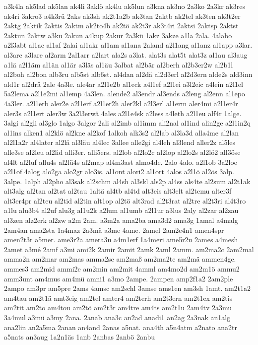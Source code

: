 {a3k4la
ak5lad
ak5lan
ak4li
3aklö
ak4lu
ak5lun
a3kna
ak3no
2a3ko
2a3kr
ak3res
ak4ri
3akro3
a4k3rü
2aks
ak3sh
ak2t1a2b
ak3tan
2aktb
ak2tel
ak3ten
ak3t2er
2aktg
2aktik
2aktis
2aktm
ak2to4b
ak2tö
ak2t3r
ak3t4ri
2aktsi
2aktsp
2aktst
2aktun
2aktw
a3ku
2akun
a4kup
2akur
2a3kü
1akz
3akze
a1la
2ala.
4alabo
a2l3abt
al1ac
al1af
2alai
al1akr
al1am
al1ana
2aland
a2l1ang
al1anz
al1app
a3lar.
al3arc
a3lare
al2arm
2al1arr
a2lart
ala2s
a3lat.
alat3s
alat5t
alat3z
al1au
al3aug
a1lä
a2l1äm
al1än
al1är
a3läs
al1äu
3albat
al2bär
al2berh
al2b3er2w
al2b1l
al2boh
al2bon
alb3ru
alb5st
alb6st.
al4dan
al2dä
al2d3erl
al2d3ern
alde2s
ald3inn
ald1r
al2drä
2ale
4a3le.
ale4ar
a2l1e2b
al1eck
a4l1ef
a2l1ei
a3l2eic
a4lein
a2l1el
5a2lema
a2l1e2mi
al1emp
4a3len.
alende2
al3endr
al3ends
a2leng
al2enn
al1epo
4a3ler.
a2l1erb
aler2e
a2l1erf
a2l1er2h
aler2kl
a2l3erl
al1erm
aler4mi
a2l1er4r
aler3s
a2l1ert
aler3w
3a2l3erwä
4ales
a2l1e4sk
a2less
a4leth
a2l1eu
alf4r
1alge.
3algi
al2gli
al3glo
1algo
3algor
2ali
al2imb
al1imm
ali2nal
al1ind
alin2ge
a2l1in2q
al1ins
alken1
al2klö
al2kne
al2kof
1alkoh
alk3s2
al2lab
al3la3d
alla4me
al2lan
al2l1a2r
al4later
al2lä
al3läu
al4lec
3allee
alle2gi
al4leh
al3lend
aller2z
al5les
alle3se
al2leu
al2lid
alli3er.
alli5ers.
al2lob
al2lo2c
al2lop
al2lo2s
al2lö2
all3öse
al4lt
al2luf
allu4s
al2lü4s
al2map
al4m3ast
almo4de.
2alo
4alo.
a2l1ob
3a2loe
a2l1of
4alog
alo2ga
alo2gr
alo3is.
al1ont
alori2
al1ort
4alos
a2l1ö
al2ös
3alp.
3alpe.
1alph
al2pho
al3sak
al2schm
al4sh
al3skl
als2p
al4ss
als4te
al2sum
al2t1ak
alt3alg
al2tan
al2tat
al2tau
1altä
al4tb
al4td
alt3eis
alt3elt
al2temu
alter3f
alt3er4pr
al2teu
al2tid
al2tin
alt1op
al2tö
alt3rad
al2t3rat
al2tre
al2t3ri
al4t3ro
a1lu
alu3b4
al2uf
alu3g
al1u2k
a2lum
al1umb
a2l1ur
a3lus
2aly
al2zar
al2zau
al3zen
alz2erk
al2zw
a2m
2am.
a3m2a
ama2ba
ama3d2
ama3g
1amal
a4malg
2am4an
ama2sta
1a4maz
2a3mä
a3me
4ame.
2amel
2am2e4n1
amen4spr
amen2t3r
a5mer.
ame3r2a
amera3u
a4m1erf
1a4meri
ame5r2u
2ames
a4mesh
2amet
a3mé
2amf
a3mi
ami2k
2amir
2amit
2amk
2aml
2amm.
am2ma2c
2am2mal
amma2n
am2mar
am2mas
amma2sc
am2maß
am2ma2te
am2mä
ammen4ge.
ammes3
am2mid
ammi2e
am2min
am2mit
4amml
am4mo2d
am2m1ö
ammu2
amm3unt
am4mus
am4mü
amni1
a3mo
2ampe.
2ampen
amp2f1a2
2am2ple
2ampo
am3pr
am5pre
2ams
4amsc
am2schl
3amse
ams1en
am3sh
1amt.
am2t1a2
am4tau
am2t1ä
amt3eig
am2tel
amter4
am2terh
am2t3ern
am2t1ex
am2tis
am2tit
am2to
am4tou
am2tö
am2t3r
am4tre
am4ts
am2t1u
2am4tv
2a3mu
3a4mul
a3mü
a3my
2ana.
2anab
ana3c
an2ad
anadi1
an2ag
2a3nak
an1alg
ana2lin
an2a5ma
2anan
an4and
2anas
a5nat.
ana4th
a5n4atm
a2nato
ana2tr
a5nats
an3aug
1a2n1äs
1anb
2anbas
2anbö
2anbu
}
